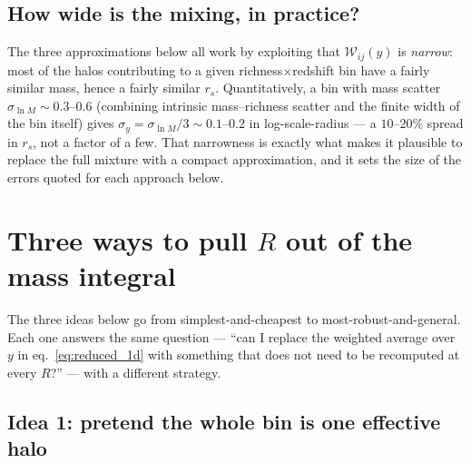 \documentclass[a4paper, 11pt]{article}
\newcommand{\lnM}{\ln M}
\newcommand{\rs}{r_s}
\newcommand{\Wcal}{\mathcal{W}}
\begin{document}
\subsection{How wide is the mixing, in practice?}

The three approximations below all work by exploiting that
$\Wcal_{ij}(y)$ is \emph{narrow}: most of the halos contributing
to a given richness$\times$redshift bin have a fairly similar
mass, hence a fairly similar $\rs$. Quantitatively, a bin with mass
scatter $\sigma_{\lnM}\sim0.3$--$0.6$ (combining intrinsic
mass--richness scatter and the finite width of the bin itself)
gives $\sigma_y=\sigma_{\lnM}/3\sim0.1$--$0.2$ in log-scale-radius
--- a $10$--$20\%$ spread in $\rs$, not a factor of a few. That
narrowness is exactly what makes it plausible to replace the full
mixture with a compact approximation, and it sets the size of the
errors quoted for each approach below.

\section{Three ways to pull \texorpdfstring{$R$}{R} out of the mass integral}
\label{sec:approaches}

The three ideas below go from simplest-and-cheapest to
most-robust-and-general. Each one answers the same question ---
``can I replace the weighted average over $y$ in
eq.~\eqref{eq:reduced_1d} with something that does not need to be
recomputed at every $R$?'' --- with a different strategy.

\subsection{Idea 1: pretend the whole bin is one effective halo}
\label{sec:approach1}
\end{document}
